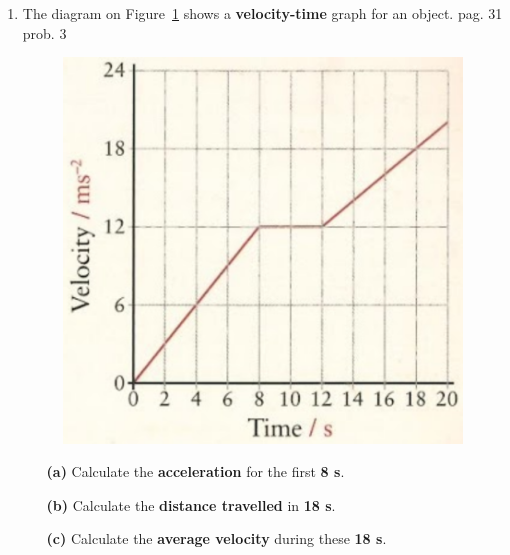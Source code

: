 \documentclass[A4,12pt]{article}
\begin{document}
\begin{enumerate}[label=\bfseries (\arabic*)]
\item The diagram on Figure~\ref{pag31prob3} shows a {\bf velocity-time} graph for an object. \cite{ASCCEA} pag. 31 prob. 3
%
\begin{figure}[H]
    \centering
    \includegraphics[scale=0.45]{pag31prob3.png}
    \caption{}
    \label{pag31prob3}
\end{figure}
%
\begin{itemize}
    \item[\bf (a)] Calculate the {\bf acceleration} for the first {\bf 8 s}.
    \item[\bf (b)] Calculate the {\bf distance travelled} in {\bf 18 s}.
    \item[\bf (c)] Calculate the {\bf average velocity} during these {\bf 18 s}.
\end{itemize}























\end{enumerate}
\end{document}
